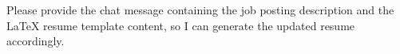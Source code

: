 Please provide the chat message containing the job posting description and the LaTeX resume template content, so I can generate the updated resume accordingly.